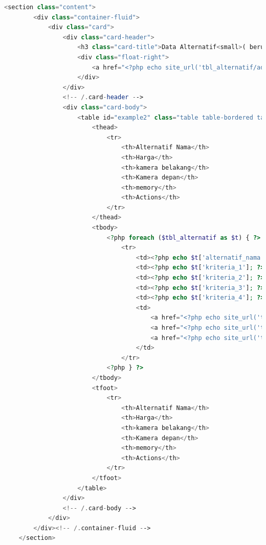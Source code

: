 \begin{lstlisting}[language=PHP]
	<section class="content">  
	    <div class="container-fluid">  
	        <div class="card">  
	            <div class="card-header">  
	                <h3 class="card-title">Data Alternatif<small>( berupa handphone )</small></h3>  
	                <div class="float-right">  
	                    <a href="<?php echo site_url('tbl_alternatif/add'); ?>" class="btn btn-success btn-sm">Tambah Data</a>  
	                </div>  
	            </div>  
	            <!-- /.card-header -->  
	            <div class="card-body">  
	                <table id="example2" class="table table-bordered table-striped">  
	                    <thead>  
	                        <tr>  
	                            <th>Alternatif Nama</th> 
	                            <th>Harga</th>  
	                            <th>kamera belakang</th>  
	                            <th>Kamera depan</th>  
	                            <th>memory</th>  
	                            <th>Actions</th>  
	                        </tr>  
	                    </thead>  
	                    <tbody>  
	                        <?php foreach ($tbl_alternatif as $t) { ?>  
	                            <tr>  
	                                <td><?php echo $t['alternatif_nama']; ?></td>  
	                                <td><?php echo $t['kriteria_1']; ?></td>  
	                                <td><?php echo $t['kriteria_2']; ?></td> 
	                                <td><?php echo $t['kriteria_3']; ?></td>  
	                                <td><?php echo $t['kriteria_4']; ?></td>  
	                                <td>  
	                                    <a href="<?php echo site_url('tbl_alternatif/detail/' . $t['alternatif_id']); ?>" class="btn btn-info btn-xs"><span class="fas fa-info"> </span> Detail Data</a>  
	                                    <a href="<?php echo site_url('tbl_alternatif/edit/' . $t['alternatif_id']); ?>" class="btn btn-warning btn-xs"><span class="fas fa-pencil-alt"> </span> Edit</a>  
	                                    <a href="<?php echo site_url('tbl_alternatif/remove/' . $t['alternatif_id']); ?>" class="btn btn-danger btn-xs"><span class="fas fa-trash"> </span> Delete</a>  
	                                </td>  
	                            </tr>  
	                        <?php } ?>  
	                    </tbody>  
	                    <tfoot>  
	                        <tr>  
	                            <th>Alternatif Nama</th>  
	                            <th>Harga</th>  
	                            <th>kamera belakang</th>  
	                            <th>Kamera depan</th>  
	                            <th>memory</th>  
	                            <th>Actions</th>  
	                        </tr>  
	                    </tfoot>  
	                </table>  
	            </div>  
	            <!-- /.card-body -->  
	        </div>  
	    </div><!-- /.container-fluid -->  
	</section>  
\end{lstlisting}


